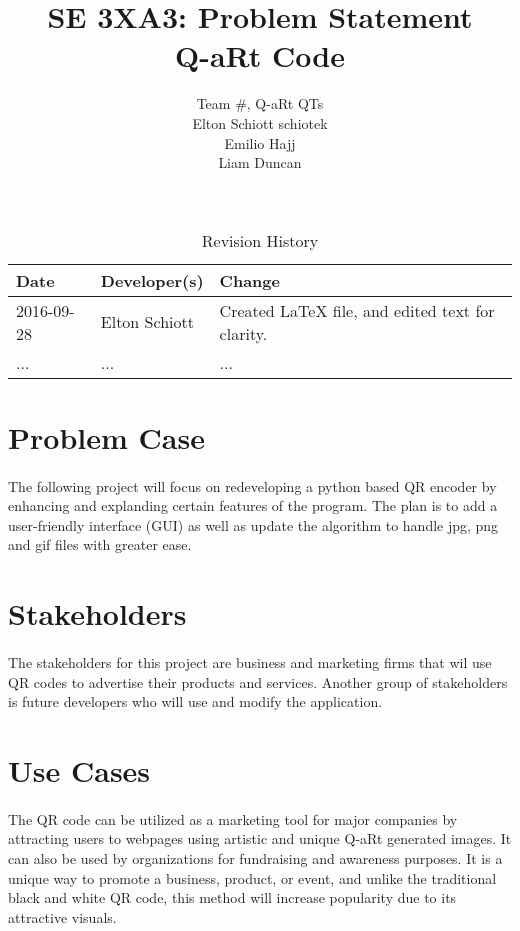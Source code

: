 \documentclass{article}
\title{SE 3XA3: Problem Statement\\Q-aRt Code}
\author{Team \#, Q-aRt QTs
		\\ Elton Schiott schiotek
		\\ Emilio Hajj
		\\ Liam Duncan
}
\date{}
\begin{document}
\begin{table}[hp]
\caption{Revision History} \label{TblRevisionHistory}
\begin{tabularx}{\textwidth}{llX}
\toprule
\textbf{Date} & \textbf{Developer(s)} & \textbf{Change}\\
\midrule
2016-09-28 & Elton Schiott & Created LaTeX file, and edited text for clarity.\\
... & ... & ...\\
\bottomrule
\end{tabularx}
\end{table}

\newpage

\maketitle

\section{Problem Case}
	
	\paragraph{}
	
		The following project will focus on redeveloping a python based QR 
		encoder by enhancing and explanding certain features of the program. 
		The plan is to add a user-friendly interface (GUI) as well as update 
		the algorithm to handle jpg, png and gif files with greater ease.
	
\section{Stakeholders}

	\paragraph{}
	
		The stakeholders for this project are business and marketing firms that 
		wil use QR codes to advertise their products and services. Another 
		group of stakeholders is future developers who will use and modify the 
		application.
	
\section{Use Cases}

	\paragraph{}
	
		The QR code can be utilized as a marketing tool for major companies by 
		attracting users to webpages using artistic and unique Q-aRt generated 
		images. It can also be used by organizations for fundraising and 
		awareness purposes. It is a unique way to promote a business, product, 
		or event, and unlike the traditional black and white QR code, this 
		method will increase popularity due to its attractive visuals.
\end{document}
